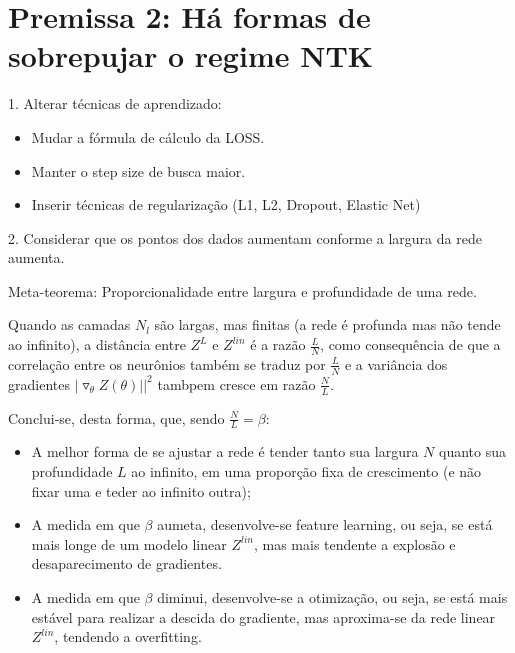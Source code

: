 \documentclass{article}
\begin{document}
\section{Premissa 2: Há formas de sobrepujar o regime NTK}
1. Alterar técnicas de aprendizado:
\begin{itemize}
    \item Mudar a fórmula de cálculo da LOSS.
    \item Manter o step size de busca maior.
    \item Inserir técnicas de regularização (L1, L2, Dropout, Elastic Net)
\end{itemize}
2. Considerar que os pontos dos dados aumentam conforme a largura da rede aumenta.

\noindent Meta-teorema: Proporcionalidade entre largura e profundidade de uma rede.

\noindent Quando as camadas $N_l$ são largas, mas finitas (a rede é profunda mas não tende ao infinito), a distância entre $Z^L$ e $Z^{lin}$ é a razão $\frac{L}{N}$, como consequência de que a correlação entre os neurônios também se traduz por $\frac{L}{N}$ e a variância dos gradientes $|\triangledown_\theta Z (\theta)||^2$ tambpem cresce em razão $\frac{N}{L}$.

\noindent Conclui-se, desta forma, que, sendo $\frac{N}{L} = \beta$:
\begin{itemize}
    \item A melhor forma de se ajustar a rede é tender tanto sua largura $N$ quanto sua profundidade $L$ ao infinito, em uma proporção fixa de crescimento (e não fixar uma e teder ao infinito outra);
    \item A medida em que $\beta$ aumeta, desenvolve-se feature learning, ou seja, se está mais longe de um modelo linear $Z^{lin}$, mas mais tendente a explosão e desaparecimento de gradientes.
    \item A medida em que $\beta$ diminui, desenvolve-se a otimização, ou seja, se está mais estável para realizar a descida do gradiente, mas aproxima-se da rede linear $Z^{lin}$, tendendo a overfitting.    
\end{itemize}
\end{document}
